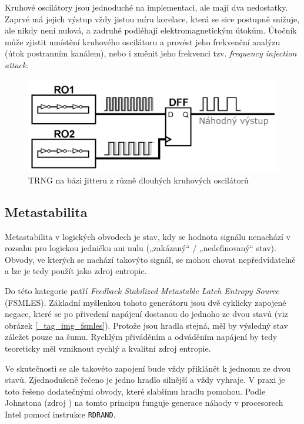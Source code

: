\documentclass[a4paper,12pt]{article}
\begin{document}
	Kruhové oscilátory jsou jednoduché na implementaci, ale mají dva nedostatky. Zaprvé má jejich výstup vždy jistou míru korelace, která se sice postupně snižuje, ale nikdy není nulová, a zadruhé podléhají elektromagnetickým útokům. Útočník může zjistit umístění kruhového oscilátoru a provést jeho frekvenční analýzu (útok postranním kanálem), nebo i změnit jeho frekvenci tzv. \textit{frequency injection attack}.
	
	\begin{figure}[ht]
		\centering
		\includegraphics[width=.9\textwidth]{src/img1}
		\caption{TRNG na bázi jitteru z různě dlouhých kruhových oscilátorů}
		\label{_tag_img_jitter}
	\end{figure}
	
	\subsection{Metastabilita}
	
	Metastabilita v logických obvodech je stav, kdy se hodnota signálu nenachází v rozsahu pro logickou jedničku ani nulu („zakázaný“ / „nedefinovaný“ stav). Obvody, ve kterých se nachází takovýto signál, se mohou chovat nepředvídatelně a lze je tedy použít jako zdroj entropie.
	
	Do této kategorie patří \textit{Feedback Stabilized Metastable Latch Entropy Source} (FSMLES). Základní myšlenkou tohoto generátoru jsou dvě cyklicky zapojené negace, které se po přivedení napájení dostanou do jednoho ze dvou stavů (viz obrázek \ref{_tag_img_fsmles}). Protože jsou hradla stejná, měl by výsledný stav záležet pouze na šumu. Rychlým přiváděním a odváděním napájení by tedy teoreticky měl vzniknout rychlý a kvalitní zdroj entropie.
	
	Ve skutečnosti se ale takovéto zapojení bude vždy přiklánět k jednomu ze dvou stavů. Zjednodušeně řečeno je jedno hradlo silnější a vždy vyhraje. V praxi je toto řešeno dodatečnými obvody, které slabšímu hradlu pomohou. Podle Johnstona (zdroj \cite{z2}) na tomto principu funguje generace náhody v procesorech Intel pomocí instrukce \texttt{RDRAND}.
		
\end{document}
